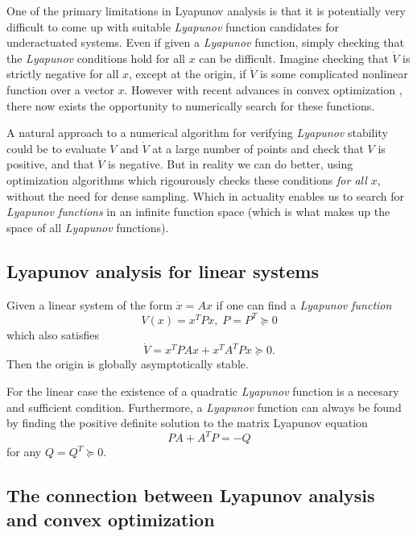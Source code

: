 One of the primary limitations in Lyapunov analysis is that it is potentially
very difficult to come up with suitable \textit{Lyapunov} function candidates
for underactuated systems. Even if given a \textit{Lyapunov} function, simply
checking that the \textit{Lyapunov} conditions hold for all \(x\) can be
difficult. Imagine checking that \(\dot{V}\) is strictly negative for all \(x\),
except at the origin, if \(\dot{V}\) is some complicated nonlinear function over
a vector \(x\). However with recent advances in convex optimization
\cite{parilloStructuredSemidefinitePrograms}, there now exists the opportunity
to numerically search for these functions.

A natural approach to a numerical algorithm for verifying \textit{Lyapunov}
stability could be to evaluate \(V\) and \(\dot{V}\) at a large number of points
and check that \(V\) is positive, and that \(\dot{V}\) is negative. But in
reality we can do better, using optimization algorithms which rigourously checks
these conditions \textit{for all \(x\)}, without the need for dense sampling.
Which in actuality enables us to search for \textit{Lyapunov functions} in an
infinite function space (which is what makes up the space of all
\textit{Lyapunov} functions).

\subsection{Lyapunov analysis for linear systems}
\label{subsec:Lyapunov analysis for linear systems}

\begin{theorem}
  Given a linear system of the form \(\dot{x} = Ax\) if one can find a
  \textit{Lyapunov function}
  \[
    V(x) = x^TPx, \; P = P^T \succeq 0
  \]
  which also satisfies
  \[
    \dot{V} = x^TPAx + x^TA^TPx \succeq 0.
  \]
  Then the origin is globally asymptotically stable.
\end{theorem} \cite{tedrakeUnderactuatedRoboticsAlgorithms2019}

For the linear case the existence of a quadratic \textit{Lyapunov} function is a
necesary and sufficient condition. Furthermore, a \textit{Lyapunov} function can
always be found by finding the positive definite solution to the matrix Lyapunov
equation
\begin{equation}
  \label{eqn:linearlyapunov}
  PA + A^TP = -Q
\end{equation}
for any \(Q = Q^T \succeq 0\).

\subsection{The connection between Lyapunov analysis and convex optimization}

